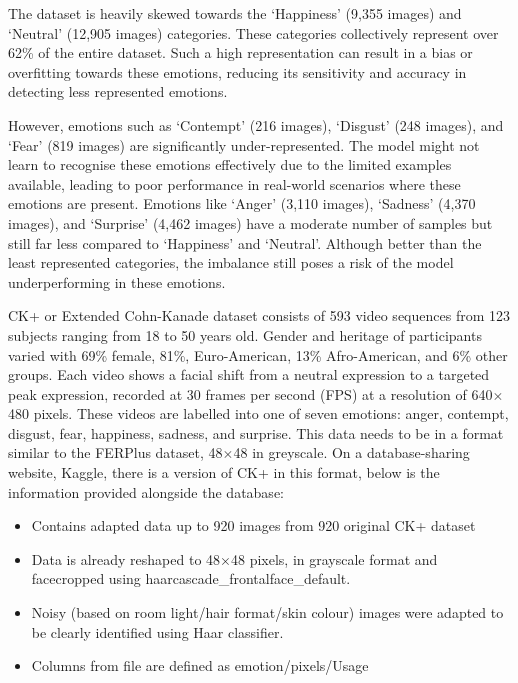 The dataset is heavily skewed towards the `Happiness' (9,355 images) and `Neutral' (12,905 images) categories. These categories collectively represent over 62\% of the entire dataset. Such a high representation can result in a bias or overfitting \cite{Rangulov2020-pd} towards these emotions, reducing its sensitivity and accuracy in detecting less represented emotions.

However, emotions such as `Contempt' (216 images), `Disgust' (248 images), and `Fear' (819 images) are significantly under-represented. The model might not learn to recognise these emotions effectively due to the limited examples available, leading to poor performance in real-world scenarios where these emotions are present. Emotions like `Anger' (3,110 images), `Sadness' (4,370 images), and `Surprise' (4,462 images) have a moderate number of samples but still far less compared to `Happiness' and `Neutral'. Although better than the least represented categories, the imbalance still poses a risk of the model underperforming in these emotions.

CK+ or Extended Cohn-Kanade dataset consists of 593 video sequences from 123 subjects ranging from 18 to 50 years old. Gender and heritage of participants varied with 69\% female, 81\%, Euro-American, 13\% Afro-American, and 6\% other groups. Each video shows a facial shift from a neutral expression to a targeted peak expression, recorded at 30 frames per second (FPS) at a resolution of 640\(\times\)480 pixels. These videos are labelled into one of seven emotions: anger, contempt, disgust, fear, happiness, sadness, and surprise. This data needs to be in a format similar to the FERPlus dataset, 48\(\times\)48 in greyscale. On a database-sharing website, Kaggle, there is a version of CK+ in this format, below is the information provided alongside the database: 

\begin{itemize}
    \item{} Contains adapted data up to 920 images from 920 original CK+ dataset
    \item{} Data is already reshaped to 48\(\times\)48 pixels, in grayscale format and facecropped using haarcascade\_frontalface\_default.
    \item{} Noisy (based on room light/hair format/skin colour) images were adapted to be clearly identified using Haar classifier.
    \item{} Columns from file are defined as emotion/pixels/Usage
\end{itemize}

